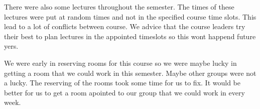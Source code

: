 There were also some lectures throughout the semester. The times of these lectures were put at random times and not in the specified course time slots.
This lead to a lot of conflicts between course.
We advice that the course leaders try their best to plan lectures in the appointed timeslots so this wont happend future yers. 

We were early in reserving rooms for this course so we were maybe lucky in getting a room that we could work in this semester. Maybe other groups were not a lucky. 
The reserving of the rooms took some time for us to fix. 
It would be better for us to get a room apointed to our group that we could work in every week. 

